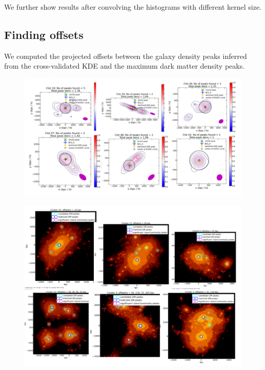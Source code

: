We further show results after convolving the histograms with different kernel
size.   




\subsection{Finding offsets} 
We computed the projected offsets between the galaxy density peaks inferred from the
cross-validated KDE and the maximum dark matter density peaks.




\begin{figure}
	\includegraphics[width=.95\linewidth]{figures/ph_fig_galaxycenter_IllustrisClusters.pdf}
	\caption{
		\label{fig:centers}}
\end{figure}


\begin{figure}
	\includegraphics[width=.95\linewidth]{figures/ph_fig_DMcenter_IllustrisClusters.pdf}
	\caption{}
\end{figure}

